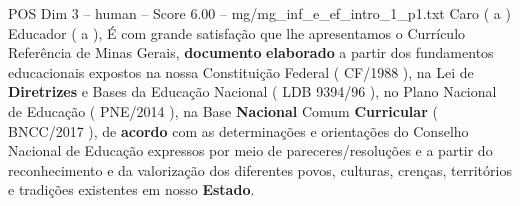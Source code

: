\begin{textsample}{POS Dim 3 – human – Score 6.00 – mg/mg\_inf\_e\_ef\_intro\_1\_p1.txt}  \label{ex:f3_pos_008}
Caro ( a ) Educador ( a ), É com grande satisfação que lhe apresentamos o Currículo Referência de Minas Gerais, \textbf{documento} \textbf{elaborado} a partir dos fundamentos educacionais expostos na nossa Constituição Federal ( CF/1988 ), na Lei de \textbf{Diretrizes} e Bases da Educação Nacional ( LDB 9394/96 ), no Plano Nacional de Educação ( PNE/2014 ), na Base \textbf{Nacional} Comum \textbf{Curricular} ( BNCC/2017 ), de \textbf{acordo} com as determinações e orientações do Conselho Nacional de Educação expressos por meio de pareceres/resoluções e a partir do reconhecimento e da valorização dos diferentes povos, culturas, crenças, territórios e tradições existentes em nosso \textbf{Estado}.

\end{textsample}
